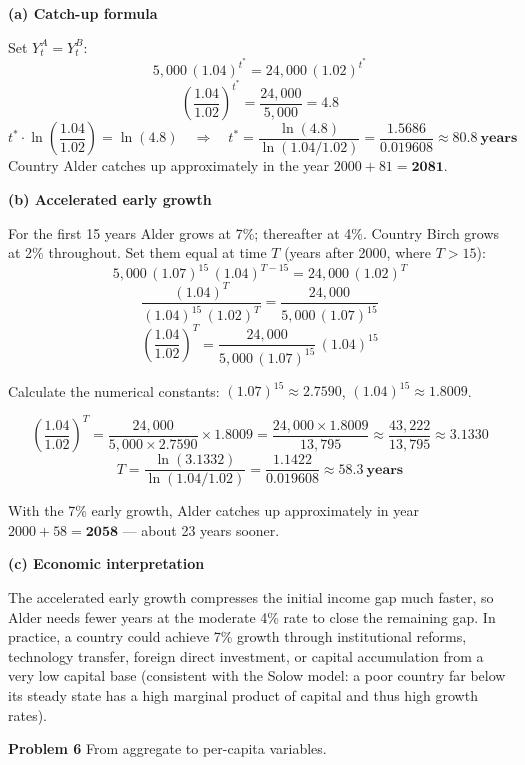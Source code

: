 \documentclass[12pt]{article}
\newenvironment{soln}{%
  \begin{tcolorbox}[
    breakable,
    colback=blue!4!white,
    colframe=blue!50!black,
    title={\textbf{Solution}},
    fonttitle=\small,
    left=4pt, right=4pt, top=4pt, bottom=4pt
  ]
}{%
  \end{tcolorbox}
}
\begin{document}
\begin{soln}
\textbf{(a) Catch-up formula}

Set $Y^A_t = Y^B_t$:
\[
  5{,}000\,(1.04)^{t^*} = 24{,}000\,(1.02)^{t^*}
\]
\[
  \left(\frac{1.04}{1.02}\right)^{t^*} = \frac{24{,}000}{5{,}000} = 4.8
\]
\[
  t^* \cdot \ln\!\left(\frac{1.04}{1.02}\right) = \ln(4.8)
  \quad\Rightarrow\quad
  t^* = \frac{\ln(4.8)}{\ln(1.04/1.02)}
  = \frac{1.5686}{0.019608} \approx \mathbf{80.8\ \text{years}}
\]
Country Alder catches up approximately in the year $2000 + 81 = \mathbf{2081}$.

\textbf{(b) Accelerated early growth}

For the first 15 years Alder grows at 7\%; thereafter at 4\%.
Country Birch grows at 2\% throughout.  Set them equal at time $T$
(years after 2000, where $T > 15$):
\[
  5{,}000\,(1.07)^{15}\,(1.04)^{T-15}
  = 24{,}000\,(1.02)^{T}
\]
\[
  \frac{(1.04)^T}{(1.04)^{15}\,(1.02)^T}
  = \frac{24{,}000}{5{,}000\,(1.07)^{15}}
\]
\[
  \left(\frac{1.04}{1.02}\right)^T
  = \frac{24{,}000}{5{,}000\,(1.07)^{15}}\,(1.04)^{15}
\]

Calculate the numerical constants:
$(1.07)^{15} \approx 2.7590$, $(1.04)^{15} \approx 1.8009$.

\[
  \left(\frac{1.04}{1.02}\right)^T
  = \frac{24{,}000}{5{,}000 \times 2.7590} \times 1.8009
  = \frac{24{,}000 \times 1.8009}{13{,}795}
  \approx \frac{43{,}222}{13{,}795}
  \approx 3.1330
\]
\[
  T = \frac{\ln(3.1332)}{\ln(1.04/1.02)}
  = \frac{1.1422}{0.019608}
  \approx \mathbf{58.3\ \text{years}}
\]

With the 7\% early growth, Alder catches up approximately in year
$2000 + 58 = \mathbf{2058}$ --- about 23 years sooner.

\textbf{(c) Economic interpretation}

The accelerated early growth compresses the initial income gap much faster,
so Alder needs fewer years at the moderate 4\% rate to close the remaining
gap.  In practice, a country could achieve 7\% growth through institutional
reforms, technology transfer, foreign direct investment, or capital
accumulation from a very low capital base (consistent with the Solow model:
a poor country far below its steady state has a high marginal product of
capital and thus high growth rates).
\end{soln}

\bigskip

\noindent\textbf{Problem 6} \quad From aggregate to per-capita variables.
\end{document}
